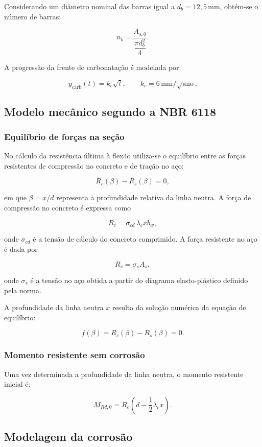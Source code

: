 Considerando um diâmetro nominal das barras igual a $d_b = 12{,}5\,\text{mm}$, obtém-se o número de barras:

\[
n_b = \frac{A_{s,0}}{\dfrac{\pi d_b^2}{4}}.
\]

A progressão da frente de carbonatação é modelada por:

\[
y_{\mathrm{carb}}(t) = k_c \sqrt{t}, 
\qquad
k_c = 6\,\text{mm}/\sqrt{\text{ano}}.
\]

\subsection{Modelo mecânico segundo a NBR 6118}

\subsubsection{Equilíbrio de forças na seção}

No cálculo da resistência última à flexão utiliza-se o equilíbrio entre as forças resistentes de compressão no concreto e de tração no aço:

\[
R_c(\beta) - R_s(\beta) = 0,
\]

em que $\beta = x/d$ representa a profundidade relativa da linha neutra. A força de compressão no concreto é expressa como

\[
R_c = \sigma_{cd}\, \lambda_c x b_w,
\]

onde $\sigma_{cd}$ é a tensão de cálculo do concreto comprimido. A força resistente no aço é dada por

\[
R_s = \sigma_s A_s,
\]

onde $\sigma_s$ é a tensão no aço obtida a partir do diagrama elasto-plástico definido pela norma.

A profundidade da linha neutra $x$ resulta da solução numérica da equação de equilíbrio:

\[
f(\beta) = R_c(\beta) - R_s(\beta) = 0.
\]

\subsubsection{Momento resistente sem corrosão}

Uma vez determinada a profundidade da linha neutra, o momento resistente inicial é:

\[
M_{Rd,0} = R_c \left( d - \frac{1}{2}\lambda_c x \right).
\]

\subsection{Modelagem da corrosão}


